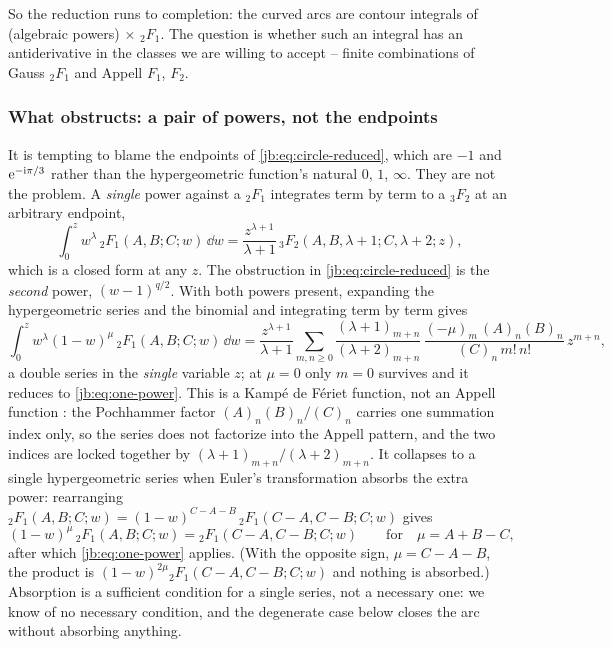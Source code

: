 So the reduction runs to completion: the curved arcs are contour integrals of
(algebraic powers) $\times$ ${}_2F_1$.
The question is whether such an integral has an antiderivative in the classes we are willing to
accept -- finite combinations of Gauss ${}_2F_1$ and Appell $F_1$, $F_2$.


\subsubsection{What obstructs: a pair of powers, not the endpoints}
\label{jb:sec:obstruction:powers}

It is tempting to blame the endpoints of \eqref{jb:eq:circle-reduced}, which are $-1$ and
$\mathrm{e}^{-\mathrm{i}\pi/3}$ rather than the hypergeometric function's natural $0$, $1$, $\infty$.
They are not the problem.
A \emph{single} power against a ${}_2F_1$ integrates term by term to a ${}_3F_2$ at an arbitrary
endpoint,
\begin{equation}
  \label{jb:eq:one-power}
  \int_0^z w^{\lambda} \, {}_2F_1(A, B; C; w) \, \dd w
    = \frac{z^{\lambda + 1}}{\lambda + 1} \,
      {}_3F_2(A, B, \lambda + 1; C, \lambda + 2; z),
\end{equation}
which is a closed form at any $z$.
The obstruction in \eqref{jb:eq:circle-reduced} is the \emph{second} power, $(w - 1)^{q/2}$.
With both powers present, expanding the hypergeometric series and the binomial and integrating term
by term gives
\begin{equation}
  \label{jb:eq:two-powers}
  \int_0^z w^{\lambda} (1 - w)^{\mu} \, {}_2F_1(A, B; C; w) \, \dd w
    = \frac{z^{\lambda + 1}}{\lambda + 1} \sum_{m, n \ge 0}
      \frac{(\lambda + 1)_{m + n}}{(\lambda + 2)_{m + n}} \,
      \frac{(- \mu)_m \, (A)_n (B)_n}{(C)_n \, m! \, n!} \, z^{m + n},
\end{equation}
a double series in the \emph{single} variable $z$; at $\mu = 0$ only $m = 0$ survives and it
reduces to \eqref{jb:eq:one-power}.
This is a Kampé de Fériet function, not an Appell function
\cite{Srivastava:1985:MultipleGaussianHypergeometric}: the Pochhammer factor
$(A)_n (B)_n / (C)_n$ carries one summation index only, so the series does not factorize into the
Appell pattern, and the two indices are locked together by $(\lambda + 1)_{m+n}/(\lambda+2)_{m+n}$.
It collapses to a single hypergeometric series when Euler's transformation absorbs the extra
power: rearranging
${}_2F_1(A, B; C; w) = (1 - w)^{C - A - B} \, {}_2F_1(C - A, C - B; C; w)$ gives
\begin{equation}
  \label{jb:eq:euler-condition}
  (1 - w)^{\mu} \, {}_2F_1(A, B; C; w)
    = {}_2F_1(C - A, C - B; C; w)
  \qquad \text{for} \quad
  \mu
    = A + B - C,
\end{equation}
after which \eqref{jb:eq:one-power} applies.
(With the opposite sign, $\mu = C - A - B$, the product is
$(1 - w)^{2 \mu} {}_2F_1(C - A, C - B; C; w)$ and nothing is absorbed.)
Absorption is a sufficient condition for a single series, not a necessary one: we know of no
necessary condition, and the degenerate case below closes the arc without absorbing anything.


